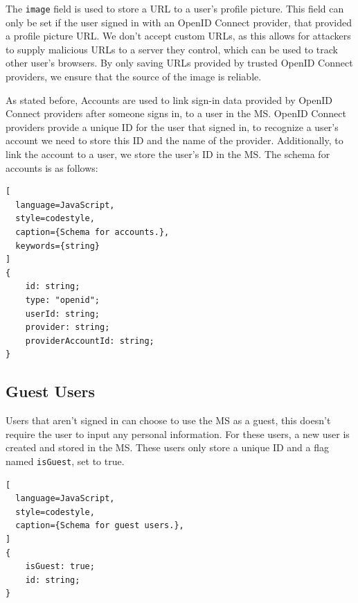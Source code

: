 The \lstinline{image} field is used to store a URL to a user's profile picture. 
This field can only be set if the user signed in with an OpenID Connect provider,
that provided a profile picture URL.
We don't accept custom URLs,
as this allows for attackers to supply malicious URLs to a server they control,
which can be used to track other user's browsers.
By only saving URLs provided by trusted OpenID Connect providers, we ensure that the
source of the image is reliable.

As stated before, Accounts are used to link sign-in data provided by OpenID Connect providers
after someone signs in, to a user in the MS.
OpenID Connect providers provide a unique ID for the user that signed in,
to recognize a user's account we need to store this ID and
the name of the provider.
Additionally, to link the account to a user, we store the user's ID in the MS.
The schema for accounts is as follows:

\begin{lstlisting}[
  language=JavaScript,
  style=codestyle,
  caption={Schema for accounts.},
  keywords={string}
]
{
    id: string;
    type: "openid";
    userId: string;
    provider: string;
    providerAccountId: string;
}
\end{lstlisting}

\subsection{Guest Users}

Users that aren't signed in can choose to use the MS as a guest, this doesn't require
the user to input any personal information.
For these users, a new user is created and stored in the MS.
These users only store a unique ID and a flag named \lstinline{isGuest}, set to true.

\begin{lstlisting}[
  language=JavaScript,
  style=codestyle,
  caption={Schema for guest users.},
]
{
    isGuest: true;
    id: string;
} 
\end{lstlisting}

